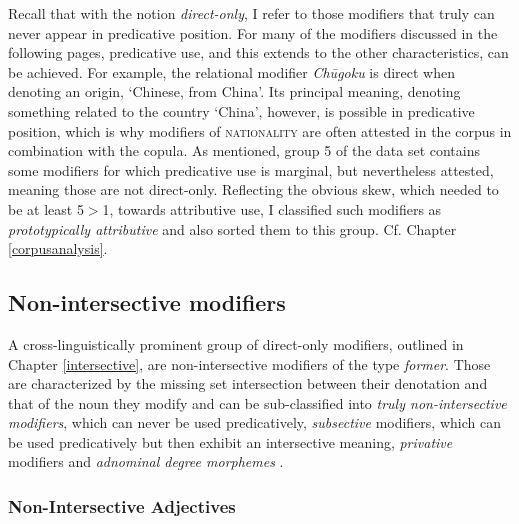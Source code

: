 \documentclass [output=book,colorlinks,citecolor=brown]{langscibook}
\begin{document}
Recall that with the notion \textit{direct-only}, I refer to those modifiers that truly can never appear in predicative position. For many of the modifiers discussed in the following pages, predicative use, and this extends to the other characteristics, can be achieved. For example, the relational modifier \textit{Chūgoku} is direct when denoting an origin, `Chinese, from China’. Its principal meaning, denoting something related to the country `China’, however, is possible in predicative position, which is why modifiers of \textsc{nationality} are often attested in the corpus in combination with the copula. As mentioned, group 5 of the data set contains some modifiers for which predicative use is marginal, but nevertheless attested, meaning those are not direct-only. Reflecting the obvious skew, which needed to be at least 5$>$1, towards attributive use, I classified such modifiers as \textit{prototypically attributive} and also sorted them to this group. Cf. Chapter \ref{corpusanalysis}.

\subsection{Non-intersective modifiers} \label{non-intersective Japanese}

A cross-linguistically prominent group of direct-only modifiers, outlined in Chapter \ref{intersective}, are non-intersective modifiers of the type \textit{former}. Those are characterized by the missing set intersection between their denotation and that of the noun they modify and can be sub-classified into \textit{truly non-intersective modifiers}, which can never be used predicatively, \textit{subsective} modifiers, which can be used predicatively but then exhibit an intersective meaning, \textit{privative} modifiers and \textit{adnominal degree morphemes} \citep{vendler:1957:verbs, bolinger:1967:adj, larson:1998:events, morzycki:2016:mod}.

\subsubsection{Non-Intersective Adjectives}
\end{document}
